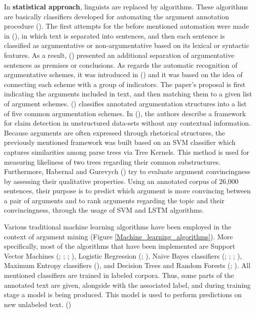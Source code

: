 In \textbf{statistical approach}, linguists are replaced by algorithms. These algorithms are basically classifiers developed for automating the argument annotation procedure (\cite{Budzynska2015}). The first attempts for the before mentioned automation were made in (\cite{Moens2007}), in which text is separated into sentences, and then each sentence is classified as argumentative or non-argumentative based on its lexical or syntactic features. As a result, (\cite{Palau2009}) presented an additional separation of argumentative sentences as premises or conclusions. As regards the automatic recognition of argumentative schemes, it was introduced in (\cite{Walton2011}) and it was based on the idea of connecting each scheme with a group of indicators. The paper's proposal is first indicating the arguments included in text, and then matching them to a given list of argument schemes. (\cite{Feng2011}) classifies annotated argumentation structures into a list of five common argumentation schemes. In (\cite{Lippi2015}), the authors describe a framework for claim detection in unstructured data-sets without any contextual information. Because arguments are often expressed through rhetorical structures, the previously mentioned framework was built based on an SVM classifier which captures similarities among parse trees via Tree Kernels. This method is used for measuring likeliness of two trees regarding their common substructures. Furthermore, Habernal and Gurevych (\cite{Habernalt2016}) try to evaluate argument convincingness by assessing their qualitative properties. Using an annotated corpus of 26,000 sentences, their purpose is to predict which argument is more convincing between a pair of arguments and to rank arguments regarding the topic and their convincingness, through the usage of SVM and LSTM algorithms. \par

Various traditional machine learning algorithms have been employed in the context of argument mining (Figure \ref{Machine_learning_algorithms}). More specifically, most of the  algorithms that have been implemented are Support Vector Machines (\cite{Mochales2011}; \cite{Park2015}; \cite{Stab2014}; \cite{Eckle-Kohler2015}), Logistic Regression (\cite{Levy2014}; \cite{Rinott2015}), Naive Bayes classifiers (\cite{Mochales2011}; \cite{Biran2011}; \cite{Park2015}; \cite{Eckle-Kohler2015}), Maximum Entropy classifiers (\cite{Mochales2011}), and Decision Trees and Random Forests (\cite{Stab2014}; \cite{Eckle-Kohler2015}). All mentioned classifiers are trained in labeled corpora. Thus, some parts of the annotated text are given, alongside with the associated label, and during training stage a model is being produced. This model is used to perform predictions on new unlabeled text. (\cite{Lippi2016}) \par

